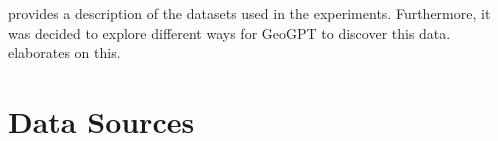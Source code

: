 \begin{comment}
\textit{Morbi viverra ante et tortor faucibus finibus nec sit amet sem. In ultrices, augue sed vestibulum congue, tortor turpis sodales odio, at interdum leo justo non massa. Nunc aliquet, nisl non vestibulum rhoncus, libero tortor laoreet nibh, vel ultricies nunc erat nec nisl. Praesent sed lorem arcu. Sed ultricies, tellus at euismod posuere, felis nibh cursus justo, vitae placerat nisl lorem ut est. Suspendisse sollicitudin sagittis nibh, ac interdum erat hendrerit id. Fusce est mi, semper eget mauris sed, posuere ultrices orci. Aenean nec est eu augue blandit maximus. Morbi ut nisl at metus condimentum tincidunt nec consectetur nibh. Phasellus eleifend dapibus elit ut cursus. Donec lacinia turpis a justo dignissim, sit amet venenatis libero pellentesque. Orci varius natoque penatibus et magnis dis parturient montes, nascetur ridiculus mus.}
\end{comment}

 provides a description of the datasets used in the experiments. Furthermore, it was decided to explore different ways for GeoGPT to discover this data.  elaborates on this.

\section{Data Sources}
\label{sec:data-sources}

